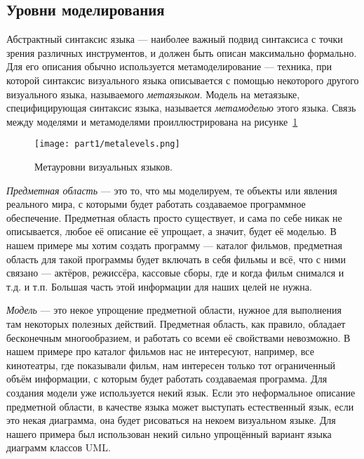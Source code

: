 \subsection{Уровни моделирования}
Абстрактный синтаксис языка --- наиболее важный подвид синтаксиса с точки зрения 
различных инструментов, и должен быть описан максимально формально. Для его 
описания обычно используется метамоделирование --- техника, при которой 
синтаксис визуального языка описывается с помощью некоторого другого 
визуального языка, называемого \textit{метаязыком}. Модель на метаязыке, специфицирующая 
синтаксис языка, называется \textit{метамоделью} этого языка. Связь между моделями и 
метамоделями проиллюстрирована на рисунке~\ref{metalevels}

\begin{figure} [ht]
	\begin{center}
		\texttt{[image: part1/metalevels.png]}
		\caption{Метауровни визуальных языков.}
		\label{metalevels}
	\end{center}
\end{figure}

\textit{Предметная область} --- это то, что мы моделируем, те объекты или явления 
реального мира, с которыми будет работать создаваемое программное обеспечение. 
Предметная область просто существует, и сама по себе никак не описывается, любое 
её описание её упрощает, а значит, будет её моделью. В нашем примере мы хотим 
создать программу --- каталог фильмов, предметная область для такой программы 
будет включать в себя фильмы и всё, что с ними связано --- актёров, режиссёра, 
кассовые сборы, где и когда фильм снимался и т.д. и т.п. Большая часть этой 
информации для наших целей не нужна.

\textit{Модель} --- это некое упрощение предметной области, нужное для выполнения там 
некоторых полезных действий. Предметная область, как правило, обладает 
бесконечным многообразием, и работать со всеми её свойствами невозможно. 
В нашем примере про каталог фильмов нас не интересуют, например, все кинотеатры, 
где показывали фильм, нам интересен только тот ограниченный объём информации,
с которым будет работать создаваемая программа. Для создания модели уже 
используется некий язык. Если это неформальное описание предметной области, в 
качестве языка может выступать естественный язык, если это некая диаграмма, она 
будет рисоваться на некоем визуальном языке. Для нашего примера был использован 
некий сильно упрощённый вариант языка диаграмм классов UML.

